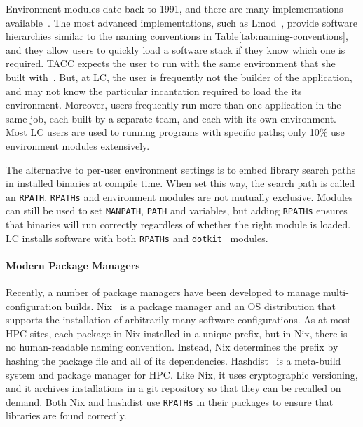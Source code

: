 Environment modules date back to 1991, and there are many implementations 
available~\cite{dotkit,furlani+:lisa91,furlani+:lisa96,mclay:lmod,mclay:lmod-tutorial}.
The most advanced implementations, such as Lmod~\cite{mclay:lmod,mclay:lmod-tutorial},
provide software hierarchies similar to the naming conventions in 
Table\ref{tab:naming-conventions}, and they allow users to quickly load a software stack
if they know which one is required.  TACC expects the user to run with the same
environment that she built with~\cite{mclay:lmod-tutorial}.  But, at LC, the user is
frequently not the builder of the application, and may not know the particular
incantation required to load the its environment. Moreover, users frequently run more 
than one application in the same job, each built by a separate team, and each with
its own environment. Most LC users are used to running programs with
specific paths; only 10\% use environment modules extensively.

The alternative to per-user environment settings is to embed library search paths
in installed binaries at compile time. When set this way, the search path is called
an {\tt RPATH}. {\tt RPATHs} and environment modules are not mutually exclusive.
Modules can still be used to set {\tt MANPATH}, {\tt PATH} and variables, but
adding {\tt RPATHs} ensures that binaries will run correctly regardless of whether
the right module is loaded. LC installs software with both {\tt RPATHs} and
{\tt dotkit}~\cite{dotkit} modules.

\paragraph{Modern Package Managers}

Recently, a number of package managers have been developed to manage 
multi-configuration builds.
%
Nix~\cite{dolstra+:icfp08,dolstra+:lisa04}
is a package manager and an OS distribution that supports the installation of
arbitrarily many software configurations.  As at most HPC sites, each package
in Nix installed in a unique prefix, but in Nix, there is no human-readable
naming convention.  Instead, Nix determines the prefix by hashing the package
file and all of its dependencies.
%
Hashdist~\cite{hashdist} is a meta-build system and package manager for HPC.
Like Nix, it uses cryptographic versioning, and it archives installations
in a git repository so that they can be recalled on demand. 
%
Both Nix and hashdist use {\tt RPATHs} in their packages to ensure that
libraries are found correctly. 

